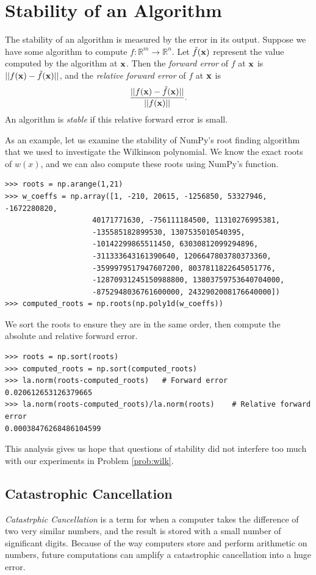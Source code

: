 \section*{Stability of an Algorithm}
The stability of an algorithm is measured by the error in its output. 
Suppose we have some algorithm to compute $f: \mathbb{R}^m \rightarrow \mathbb{R}^n$.
Let $\tilde f({\bf x})$ represent the value computed by the algorithm at ${\bf x}$.
Then the \emph{forward error} of $f$ at ${\bf x}$ is $||f({\bf x})-\tilde f({\bf x})||$, and the \emph{relative forward error} of $f$ at ${\bf x}$ is
\[
\frac{||f({\bf x})-\tilde f({\bf x})||}{||f({\bf x})||}.
\]
An algorithm is \emph{stable} if this relative forward error is small.

As an example, let us examine the stability of NumPy's root finding algorithm that we used to investigate the Wilkinson polynomial.
We know the exact roots of $w(x)$, and we can also compute these roots using NumPy's  function.
\begin{lstlisting}
>>> roots = np.arange(1,21)
>>> w_coeffs = np.array([1, -210, 20615, -1256850, 53327946, -1672280820,
                    40171771630, -756111184500, 11310276995381,
                    -135585182899530, 1307535010540395,
                    -10142299865511450, 63030812099294896,
                    -311333643161390640, 1206647803780373360,
                    -3599979517947607200, 8037811822645051776,
                    -12870931245150988800, 13803759753640704000,
                    -8752948036761600000, 2432902008176640000])
>>> computed_roots = np.roots(np.poly1d(w_coeffs))
\end{lstlisting}
We sort the roots to ensure they are in the same order, then compute the absolute and relative forward error.
\begin{lstlisting}
>>> roots = np.sort(roots)
>>> computed_roots = np.sort(computed_roots)
>>> la.norm(roots-computed_roots)	# Forward error
0.020612653126379665
>>> la.norm(roots-computed_roots)/la.norm(roots)	# Relative forward error
0.00038476268486104599
\end{lstlisting}

This analysis gives us hope that questions of stability did not interfere too much with our experiments in Problem \ref{prob:wilk}.

\subsection*{Catastrophic Cancellation}
\emph{Catastrphic Cancellation} is a term for when a computer takes the difference of two very similar numbers, and the result is stored with a small number of significant digits.
Because of the way computers store and perform arithmetic on numbers, future computations can amplify a catastrophic cancellation into a huge error.

